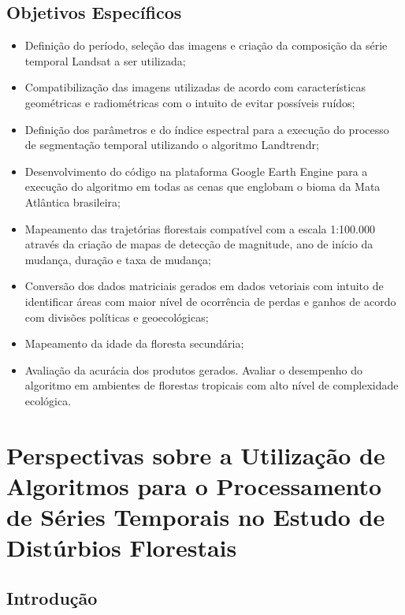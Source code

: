 \documentclass[12pt,a4paper]{article}
\begin{document}
\subsection{Objetivos Específicos}
\begin{itemize}
    \item Definição do período, seleção das imagens e criação da composição da série temporal Landsat a ser utilizada;
    
    \item Compatibilização das imagens utilizadas de acordo com características geométricas e radiométricas com o intuito de evitar possíveis ruídos;
    
    \item Definição dos parâmetros e do índice espectral para a execução do processo de segmentação temporal utilizando o algoritmo Landtrendr;
    
    \item Desenvolvimento do código na plataforma Google Earth Engine para a execução do algoritmo em todas as cenas que englobam o bioma da Mata Atlântica brasileira;
    
    \item Mapeamento das trajetórias florestais compatível com a escala 1:100.000 através da criação de mapas de detecção de magnitude, ano de início da mudança, duração e taxa de mudança;
    
    \item Conversão dos dados matriciais gerados em dados vetoriais com intuito de identificar áreas com maior nível de ocorrência de perdas e ganhos de acordo com divisões políticas e geoecológicas;
    
    \item Mapeamento da idade da floresta secundária;
    
    \item Avaliação da acurácia dos produtos gerados. Avaliar o desempenho do algoritmo em ambientes de florestas tropicais com alto nível de complexidade ecológica.
\end{itemize}
\newpage

\section{Perspectivas sobre a Utilização de Algoritmos para o Processamento de Séries Temporais no Estudo de Distúrbios Florestais}

\subsection{Introdução}
\end{document}
